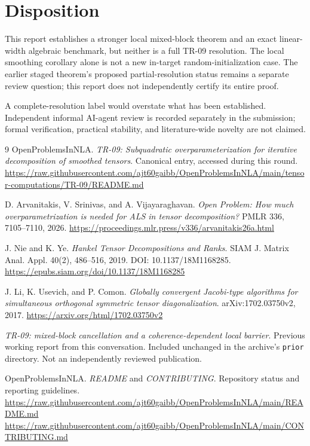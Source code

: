 \documentclass[11pt]{article}
\theoremstyle{remark}\newtheorem{remark}[theorem]{Remark}
\begin{document}
\section{Disposition}
This report establishes a stronger local mixed-block theorem and an exact linear-width algebraic benchmark, but neither is a full TR-09 resolution. The local smoothing corollary alone is not a new in-target random-initialization case. The earlier staged theorem's proposed partial-resolution status remains a separate review question; this report does not independently certify its entire proof.

A complete-resolution label would overstate what has been established. Independent informal AI-agent review is recorded separately in the submission; formal verification, practical stability, and literature-wide novelty are not claimed.

\begingroup\small
\begin{thebibliography}{9}
\label{ref:repo}
OpenProblemsInNLA. \emph{TR-09: Subquadratic overparameterization for iterative decomposition of smoothed tensors}. Canonical entry, accessed during this round.\newline
\url{https://raw.githubusercontent.com/ajt60gaibb/OpenProblemsInNLA/main/tensor-computations/TR-09/README.md}

\label{ref:colt}
D. Arvanitakis, V. Srinivas, and A. Vijayaraghavan. \emph{Open Problem: How much overparametrization is needed for ALS in tensor decomposition?} PMLR 336, 7105--7110, 2026.\newline
\url{https://proceedings.mlr.press/v336/arvanitakis26a.html}

\label{ref:hankel}
J. Nie and K. Ye. \emph{Hankel Tensor Decompositions and Ranks}. SIAM J. Matrix Anal. Appl. 40(2), 486--516, 2019. DOI: 10.1137/18M1168285.\newline
\url{https://epubs.siam.org/doi/10.1137/18M1168285}

\label{ref:jacobi}
J. Li, K. Usevich, and P. Comon. \emph{Globally convergent Jacobi-type algorithms for simultaneous orthogonal symmetric tensor diagonalization}. arXiv:1702.03750v2, 2017.\newline
\url{https://arxiv.org/html/1702.03750v2}

\label{ref:previous}
\emph{TR-09: mixed-block cancellation and a coherence-dependent local barrier}. Previous working report from this conversation. Included unchanged in the archive's \texttt{prior} directory. Not an independently reviewed publication.

\label{ref:rubric}
OpenProblemsInNLA. \emph{README} and \emph{CONTRIBUTING}. Repository status and reporting guidelines.\newline
\url{https://raw.githubusercontent.com/ajt60gaibb/OpenProblemsInNLA/main/README.md}\newline
\url{https://raw.githubusercontent.com/ajt60gaibb/OpenProblemsInNLA/main/CONTRIBUTING.md}
\end{thebibliography}
\endgroup
\end{document}
